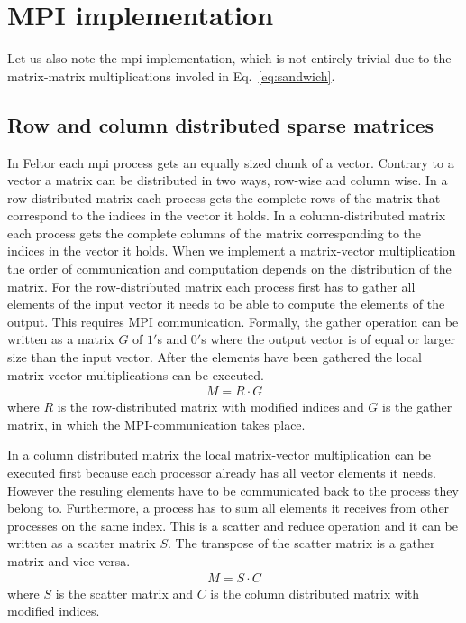 \section{MPI implementation}
Let us also note the mpi-implementation, which is not entirely
trivial due to the matrix-matrix multiplications involed in Eq.~\eqref{eq:sandwich}.
\subsection{Row and column distributed sparse matrices}
In Feltor each mpi process gets an equally sized chunk of a 
vector.
Contrary to a vector
a matrix can be distributed in two ways, row-wise and column wise. 
In a row-distributed matrix each process gets the complete 
rows of the matrix that correspond to the indices in the 
vector it holds. 
In a column-distributed matrix each process gets the complete 
columns of the matrix corresponding to the indices in the 
vector it holds. 
When we implement a matrix-vector multiplication the order 
of communication and computation depends on the distribution 
of the matrix.
For the row-distributed matrix each process first has to gather all elements of the input vector it needs to be able to compute the elements of the output. This requires MPI communication.
Formally, the gather operation can be written as a matrix $G$
of $1'$s and $0'$s where the output vector is of equal or larger size than the input vector.
After the elements have been gathered the local matrix-vector
multiplications can be executed.
\begin{align}
M = R\cdot G
\end{align}
where $R$ is the row-distributed matrix with modified indices 
and $G$ is the gather matrix, in which the MPI-communication takes place.

In a column distributed matrix the local matrix-vector multiplication can be executed first because each processor already
has all vector elements it needs. 
However the resuling elements have to be communicated back to 
the process they belong to. Furthermore, a process has to sum
all elements it receives from other processes on the same
index. This is a scatter and reduce operation and
it can be written as a scatter matrix $S$. The transpose
of the scatter matrix is a gather matrix and vice-versa.
\begin{align}
M = S\cdot C
\end{align}
where $S$ is the scatter matrix and $C$ is the column distributed
matrix with modified indices. 

